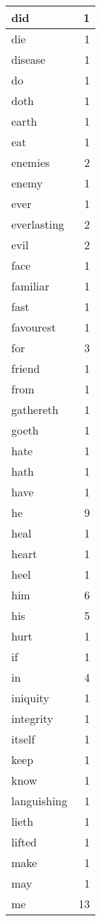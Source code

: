 \begin{center}
\begin{longtable}{l|r}
did & 1 \\ \hline
die & 1 \\ \hline
disease & 1 \\ \hline
do & 1 \\ \hline
doth & 1 \\ \hline
earth & 1 \\ \hline
eat & 1 \\ \hline
enemies & 2 \\ \hline
enemy & 1 \\ \hline
ever & 1 \\ \hline
everlasting & 2 \\ \hline
evil & 2 \\ \hline
face & 1 \\ \hline
familiar & 1 \\ \hline
fast & 1 \\ \hline
favourest & 1 \\ \hline
for & 3 \\ \hline
friend & 1 \\ \hline
from & 1 \\ \hline
gathereth & 1 \\ \hline
goeth & 1 \\ \hline
hate & 1 \\ \hline
hath & 1 \\ \hline
have & 1 \\ \hline
he & 9 \\ \hline
heal & 1 \\ \hline
heart & 1 \\ \hline
heel & 1 \\ \hline
him & 6 \\ \hline
his & 5 \\ \hline
hurt & 1 \\ \hline
if & 1 \\ \hline
in & 4 \\ \hline
iniquity & 1 \\ \hline
integrity & 1 \\ \hline
itself & 1 \\ \hline
keep & 1 \\ \hline
know & 1 \\ \hline
languishing & 1 \\ \hline
lieth & 1 \\ \hline
lifted & 1 \\ \hline
make & 1 \\ \hline
may & 1 \\ \hline
me & 13 \\ \hline

\end{longtable}
\end{center}
